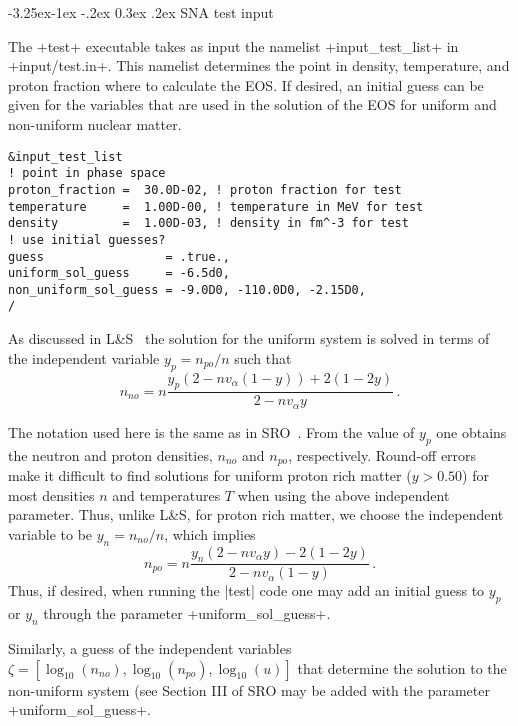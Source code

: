 \documentclass[letterpaper,11pt]{refart}
\makeatletter
\newcommand{\LSn}{L\&S}
\renewcommand\subsubsection{\@startsection{subsubsection}{3}{\z@}%
                           {-3.25ex\@plus -1ex \@minus -.2ex}%
                           {0.3ex \@plus .2ex}%
                           {\normalfont\normalsize\bf\fontsize{11}{13}\selectfont}}
\makeatother
\begin{document}
\bigskip

\subsubsection{SNA test input}\label{sssec:SNA_test_in}


The \verbexec+test+ executable takes as input the namelist
\verbnml+input_test_list+ in
\verbfile+input/test.in+.  This namelist determines the point in density, 
temperature, and proton fraction
where to calculate the EOS. If desired, an initial guess can be given
for the variables that are used in the solution of the EOS for 
uniform and non-uniform nuclear matter.


{\color{cyan}
\begin{verbatim}
&input_test_list
! point in phase space
proton_fraction =  30.0D-02, ! proton fraction for test
temperature     =  1.00D-00, ! temperature in MeV for test
density         =  1.00D-03, ! density in fm^-3 for test
! use initial guesses?
guess                 = .true.,
uniform_sol_guess     = -6.5d0,
non_uniform_sol_guess = -9.0D0, -110.0D0, -2.15D0,
/
\end{verbatim}}
As discussed in \LSn~\cite{lattimer:91} the solution for the uniform system 
is solved in terms of the independent variable $y_p=n_{po}/n$ such that
\begin{equation}
n_{no}=n\frac{y_p(2-nv_\alpha(1-y))+2(1-2y)}{2-nv_\alpha y}\,.
\end{equation}

The notation used here is the same as in SRO~\cite{schneider:17}.
From the value of $y_p$ one obtains the neutron and proton densities,
$n_{no}$ and $n_{po}$, respectively.  Round-off errors make it
difficult to find solutions for uniform proton rich matter ($y>0.50$)
for most densities $n$ and temperatures $T$ when using the above
independent parameter.  Thus, unlike \LSn, for proton rich matter, we
choose the independent variable to be $y_n=n_{no}/n$, which implies
\begin{equation}
n_{po}=n\frac{y_n(2-nv_\alpha y)-2(1-2y)}{2-nv_\alpha (1-y)}\,.
\end{equation}
Thus, if desired, when running the \verbexec|test| code one may add an
initial guess to $y_p$ or $y_n$ through the parameter
\verbprm+uniform_sol_guess+. 


Similarly, a guess of the independent variables
$\zeta=[\log_{10}(n_{no}), \log_{10}(n_{po}), \log_{10}(u)]$ that
determine the solution to the non-uniform system (see Section III of
SRO \cite{schneider:17} may be added with the parameter
\verbprm+uniform_sol_guess+.
\end{document}
